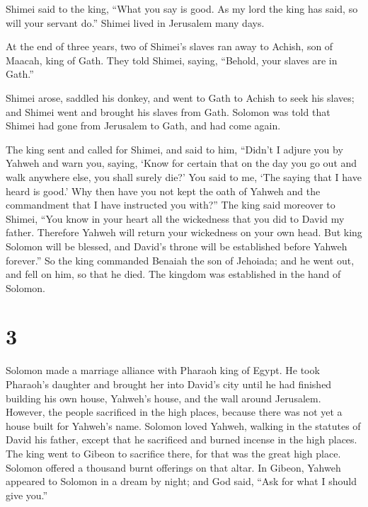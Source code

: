  Shimei said to the king, ``What you say is good. As my
lord the king has said, so will your servant do.'' Shimei lived in
Jerusalem many days.

 At the end of three years, two of Shimei's slaves ran away
to Achish, son of Maacah, king of Gath. They told Shimei, saying,
``Behold, your slaves are in Gath.''

 Shimei arose, saddled his donkey, and went to Gath to
Achish to seek his slaves; and Shimei went and brought his slaves from
Gath.  Solomon was told that Shimei had gone from Jerusalem
to Gath, and had come again.

 The king sent and called for Shimei, and said to him,
``Didn't I adjure you by Yahweh and warn you, saying, `Know for certain
that on the day you go out and walk anywhere else, you shall surely
die?' You said to me, `The saying that I have heard is good.'
 Why then have you not kept the oath of Yahweh and the
commandment that I have instructed you with?''  The king
said moreover to Shimei, ``You know in your heart all the wickedness
that you did to David my father. Therefore Yahweh will return your
wickedness on your own head.  But king Solomon will be
blessed, and David's throne will be established before Yahweh forever.''
 So the king commanded Benaiah the son of Jehoiada; and he
went out, and fell on him, so that he died. The kingdom was established
in the hand of Solomon.

\hypertarget{section-2}{%
\section{3}\label{section-2}}

 Solomon made a marriage alliance with Pharaoh king of
Egypt. He took Pharaoh's daughter and brought her into David's city
until he had finished building his own house, Yahweh's house, and the
wall around Jerusalem.  However, the people sacrificed in
the high places, because there was not yet a house built for Yahweh's
name.  Solomon loved Yahweh, walking in the statutes of
David his father, except that he sacrificed and burned incense in the
high places.  The king went to Gibeon to sacrifice there,
for that was the great high place. Solomon offered a thousand burnt
offerings on that altar.  In Gibeon, Yahweh appeared to
Solomon in a dream by night; and God said, ``Ask for what I should give
you.''

